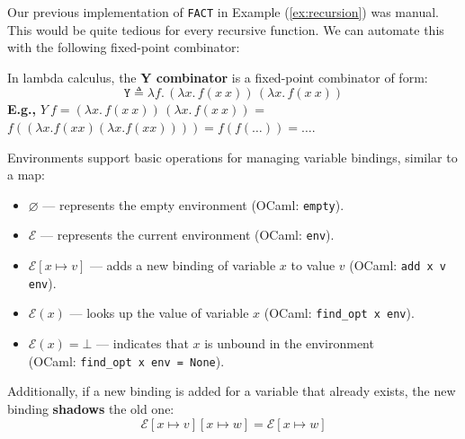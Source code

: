 \noindent
Our previous implementation of \texttt{FACT} in Example (\ref{ex:recursion}) was manual. This would be 
quite tedious for every recursive function. We can automate this with the following fixed-point combinator:
\begin{Def}[Y Combinator]

    \label{def:y-combinator}
    In lambda calculus, the \textbf{Y combinator} is a fixed-point combinator of form:
    \LARGE
    \[
        \texttt{Y} \triangleq \lambda f.\, (\lambda x.\, f (x\ x))\, (\lambda x.\, f (x\ x))
    \]
    \normalsize
    \noindent
    \textbf{E.g.,} $Y\ f = (\lambda x.\, f (x\ x))\, (\lambda x.\, f (x\ x))$ = $f((\lambda x.f(xx)(\lambda x.f(xx))))=f(f(\dots))=\dots$.

\end{Def}
\newpage

\noindent


\begin{Def}

    \label{def:env-operations}

    \noindent
    Environments support basic operations for managing variable bindings, similar to a map:

    \begin{itemize}
        \item \(\varnothing\) — represents the empty environment (OCaml: \texttt{empty}).
        \item \(\mathcal{E}\) — represents the current environment (OCaml: \texttt{env}).
        \item \(\mathcal{E}[x \mapsto v]\) — adds a new binding of variable \(x\) to value \(v\) (OCaml: \texttt{add x v env}).
        
        \item \(\mathcal{E}(x)\) — looks up the value of variable \(x\) (OCaml: \texttt{find\_opt x env}).
        
        \item \(\mathcal{E}(x) = \bot\) — indicates that \(x\) is unbound in the environment\\ (OCaml: \texttt{find\_opt x env = None}).
    \end{itemize}

    \noindent
    Additionally, if a new binding is added for a variable that already exists, the new binding \textbf{shadows} the old one:
    \[
    \mathcal{E}[x \mapsto v][x \mapsto w] = \mathcal{E}[x \mapsto w]
    \]
\end{Def}

